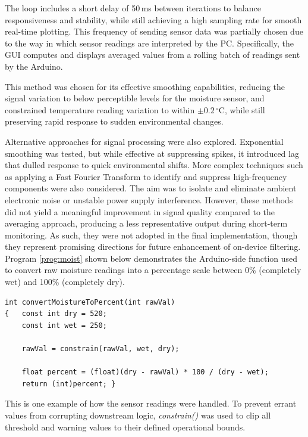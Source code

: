 \documentclass[a4paper,11pt]{article}
\begin{document}
The loop includes a short delay of 50\,ms between iterations to balance 
responsiveness and stability, while still achieving a high sampling rate 
for smooth real-time plotting.
This frequency of sending sensor data was partially chosen due to 
the way in which sensor readings are interpreted by the PC.
Specifically, the GUI computes and displays averaged values from a rolling 
batch of readings sent by the Arduino.

This method was chosen for its effective smoothing capabilities,
reducing the signal variation to below 
perceptible levels for the moisture sensor, 
and constrained temperature reading variation to within 
$\pm 0.2\,^\circ\mathrm{C}$, while still preserving rapid 
response to sudden environmental changes.

Alternative approaches for signal processing were also explored.
Exponential smoothing was tested, but while effective at 
suppressing spikes, it introduced lag that dulled response to 
quick environmental shifts. 
More complex techniques such as applying a Fast Fourier Transform 
to identify and suppress high-frequency components were also considered. 
The aim was to isolate and eliminate ambient electronic noise 
or unstable power supply interference.
However, these methods did not yield a meaningful 
improvement in signal quality compared to the averaging approach,
producing a less representative output during short-term monitoring. 
As such, they were not adopted in the final implementation, 
though they represent promising directions for future enhancement 
of on-device filtering. 
Program \ref{prog:moist} shown below demonstrates 
the Arduino-side function used to convert raw moisture readings 
into a percentage scale between 0\% (completely wet) and 100\% (completely dry).

\begin{lstlisting}[style=cpp-style, 
caption={Arduino moisture conversion}, label={prog:moist}]
int convertMoistureToPercent(int rawVal)
{   const int dry = 520;
    const int wet = 250;

    rawVal = constrain(rawVal, wet, dry);

    float percent = (float)(dry - rawVal) * 100 / (dry - wet);
    return (int)percent; }
\end{lstlisting}

This is one example of how the sensor readings were handled.
To prevent errant values from corrupting downstream logic, 
\textit{constrain()} was used to clip all threshold and 
warning values to their defined operational bounds.
\end{document}
